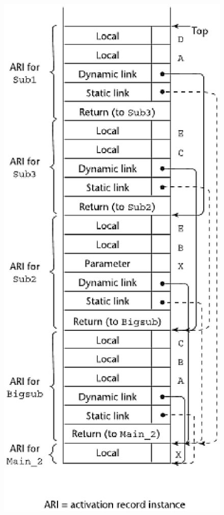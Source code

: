 \documentclass[a4paper,12pt]{article}
\begin{document}
\begin{figure}
\centering
\includegraphics[scale=0.5]{ari}
\end{figure}
\end{document}
